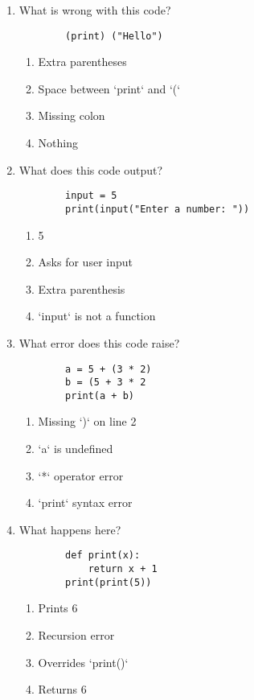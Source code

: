 \documentclass{article}
\begin{document}
\begin{enumerate}
        \item What is wrong with this code?
        \begin{lstlisting}
        (print) ("Hello")
        \end{lstlisting}
        \begin{enumerate}[label=(\Alph*)]
            \item Extra parentheses
            \item Space between `print` and `(`
            \item Missing colon
            \item Nothing
        \end{enumerate}

        \item What does this code output?
        \begin{lstlisting}
        input = 5
        print(input("Enter a number: "))
        \end{lstlisting}
        \begin{enumerate}[label=(\Alph*)]
            \item 5
            \item Asks for user input
            \item Extra parenthesis
            \item `input` is not a function
        \end{enumerate}

        \item What error does this code raise?
        \begin{lstlisting}
        a = 5 + (3 * 2)
        b = (5 + 3 * 2
        print(a + b)
        \end{lstlisting}
        \begin{enumerate}[label=(\Alph*)]
            \item Missing `)` on line 2
            \item `a` is undefined
            \item `*` operator error
            \item `print` syntax error
        \end{enumerate}

        \item What happens here?
        \begin{lstlisting}
        def print(x):
            return x + 1
        print(print(5))
        \end{lstlisting}
        \begin{enumerate}[label=(\Alph*)]
            \item Prints 6
            \item Recursion error
            \item Overrides `print()`
            \item Returns 6
        \end{enumerate}


\end{enumerate}
\end{document}
